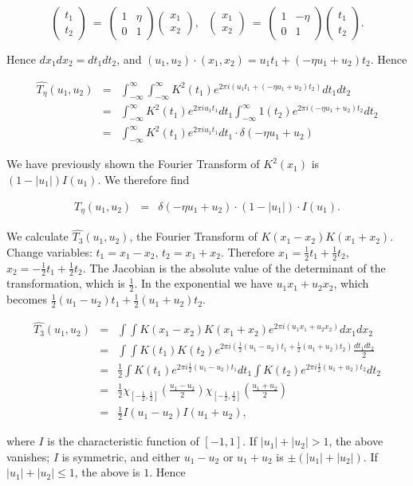 \documentclass{compositio}
\newcommand{\twovec}[2]
{\left(\begin{array}{c}
                        #1    \\
                        #2
                          \end{array}\right) }
\newcommand{\mattwo}[4]
{\left(\begin{array}{cc}
                        #1  & #2   \\
                        #3 &  #4
                          \end{array}\right) }
\newcommand\be{\begin{equation}}
\newcommand\ee{\end{equation}}
\newcommand{\foh}{\frac{1}{2}}  %
\newcommand{\chiint}{\chi_{[-\foh,\foh]}}
\begin{document}
\be \twovec{t_1}{t_2} \ = \ \mattwo{1}{\eta}{0}{1}
\twovec{x_1}{x_2}, \ \ \ \twovec{x_1}{x_2} \ = \
\mattwo{1}{-\eta}{0}{1}\twovec{t_1}{t_2}. \ee

Hence $dx_1dx_2 = dt_1dt_2$, and $(u_1,u_2) \cdot (x_1,x_2) =
u_1t_1 + (-\eta u_1 + u_2)t_2$. Hence

\begin{eqnarray}
\widehat{T_\eta}(u_1,u_2) & = & \int_{-\infty}^\infty
\int_{-\infty}^\infty K^2(t_1) e^{2 \pi i ( u_1t_1 + (-\eta u_1 +
u_2)t_2)}dt_1dt_2 \nonumber\\ & = & \int_{-\infty}^\infty K^2(t_1)
e^{2 \pi i u_1t_1} dt_1 \int_{-\infty}^\infty 1(t_2) e^{2 \pi i
(-\eta u_1 + u_2)t_2} dt_2 \nonumber\\ & = & \int_{-\infty}^\infty
K^2(t_1) e^{2 \pi i u_1t_1} dt_1 \cdot \delta(-\eta u_1 + u_2)
\end{eqnarray}

We have previously shown the Fourier Transform of $K^2(x_1)$ is
$(1 - |u_1|)I(u_1)$. We therefore find

\begin{eqnarray}
T_\eta(u_1,u_2) & = & \delta(-\eta u_1 + u_2) \cdot (1 - |u_1|
)\cdot I(u_1).
\end{eqnarray}

We calculate $\widehat{T_3}(u_1,u_2)$, the Fourier Transform of
$K(x_1-x_2)K(x_1+x_2)$. Change variables: $t_1 = x_1 - x_2$, $t_2
= x_1 + x_2$. Therefore $x_1 = \foh t_1 + \foh t_2$, $x_2 = -\foh
t_1 + \foh t_2$. The Jacobian is the absolute value of the
determinant of the transformation, which is $\foh$. In the
exponential we have $u_1x_1 + u_2x_2$, which becomes
$\foh(u_1-u_2)t_1 + \foh(u_1+u_2)t_2$.

\begin{eqnarray}
\widehat{T_3}(u_1,u_2) & = & \int \int K(x_1-x_2) K(x_1+x_2) e^{2
\pi i (u_1x_1 + u_2x_2)} dx_1 dx_2 \nonumber\\ & = & \int \int
K(t_1) K(t_2) e^{2 \pi i (\foh(u_1-u_2)t_1 + \foh(u_1+u_2)t_2)}
\frac{dt_1 dt_2}{2} \nonumber\\ & = & \foh \int K(t_1) e^{2 \pi i
\foh (u_1-u_2)t_1} dt_1 \int K(t_2) e^{2 \pi i \foh (u_1+u_2)t_2}
dt_2 \nonumber\\ & = & \foh \chiint(\frac{u_1-u_2}{2})
\chiint(\frac{u_1+u_2}{2}) \nonumber\\ & = & \foh I(u_1-u_2)
I(u_1+u_2),
\end{eqnarray}

where $I$ is the characteristic function of $[-1,1]$. If $|u_1| +
|u_2| > 1$, the above vanishes; $I$ is symmetric, and either $u_1
- u_2$ or $u_1 + u_2$ is $\pm(|u_1|+|u_2|)$. If $|u_1| + |u_2|
\leq 1$, the above is $1$. Hence
\end{document}
